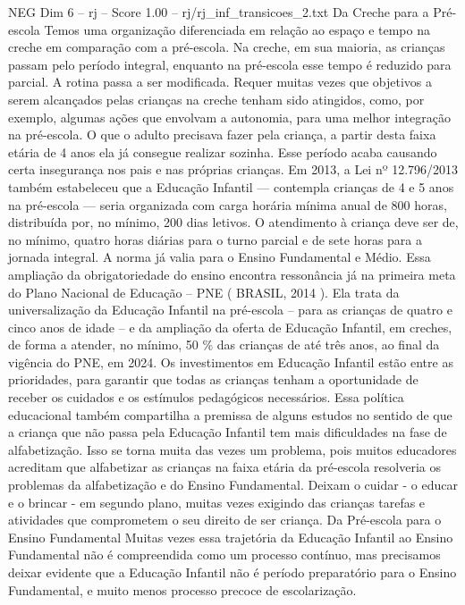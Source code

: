 \begin{textsample}{NEG Dim 6 – rj – Score 1.00 – rj/rj\_inf\_transicoes\_2.txt}  \label{ex:f6_neg_002}
Da Creche para a Pré-escola Temos uma organização diferenciada em relação ao espaço e tempo na creche em comparação com a pré-escola.
Na creche, em sua maioria, as crianças passam pelo período integral, enquanto na pré-escola esse tempo é reduzido para parcial.
A rotina passa a ser modificada.
Requer muitas vezes que objetivos a serem alcançados pelas crianças na creche tenham sido atingidos, como, por exemplo, algumas ações que envolvam a autonomia, para uma melhor integração na pré-escola.
O que o adulto precisava fazer pela criança, a partir desta faixa etária de 4 anos ela já consegue realizar sozinha.
Esse período acaba causando certa insegurança nos pais e nas próprias crianças.
Em 2013, a Lei nº 12.796/2013 também estabeleceu que a Educação Infantil — contempla crianças de 4 e 5 anos na pré-escola — seria organizada com carga horária mínima anual de 800 horas, distribuída por, no mínimo, 200 dias letivos.
O atendimento à criança deve ser de, no mínimo, quatro horas diárias para o turno parcial e de sete horas para a jornada integral.
A norma já valia para o Ensino Fundamental e Médio.
Essa ampliação da obrigatoriedade do ensino encontra ressonância já na primeira meta do Plano Nacional de Educação – PNE ( BRASIL, 2014 ).
Ela trata da universalização da Educação Infantil na pré-escola – para as crianças de quatro e cinco anos de idade – e da ampliação da oferta de Educação Infantil, em creches, de forma a atender, no mínimo, 50 \% das crianças de até três anos, ao final da vigência do PNE, em 2024.
Os investimentos em Educação Infantil estão entre as prioridades, para garantir que todas as crianças tenham a oportunidade de receber os cuidados e os estímulos pedagógicos necessários.
Essa política educacional também compartilha a premissa de alguns estudos no sentido de que a criança que não passa pela Educação Infantil tem mais dificuldades na fase de alfabetização.
Isso se torna muita das vezes um problema, pois muitos educadores acreditam que alfabetizar as crianças na faixa etária da pré-escola resolveria os problemas da alfabetização e do Ensino Fundamental.
Deixam o cuidar - o educar e o brincar - em segundo plano, muitas vezes exigindo das crianças tarefas e atividades que comprometem o seu direito de ser criança.
Da Pré-escola para o Ensino Fundamental Muitas vezes essa trajetória da Educação Infantil ao Ensino Fundamental não é compreendida como um processo contínuo, mas precisamos deixar evidente que a Educação Infantil não é período preparatório para o Ensino Fundamental, e muito menos processo precoce de escolarização.

\end{textsample}
